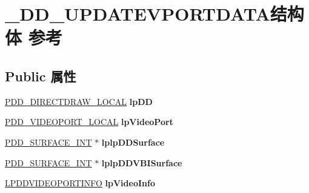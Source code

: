 \hypertarget{struct___d_d___u_p_d_a_t_e_v_p_o_r_t_d_a_t_a}{}\section{\+\_\+\+D\+D\+\_\+\+U\+P\+D\+A\+T\+E\+V\+P\+O\+R\+T\+D\+A\+T\+A结构体 参考}
\label{struct___d_d___u_p_d_a_t_e_v_p_o_r_t_d_a_t_a}
\subsection*{Public 属性}
\begin{DoxyCompactItemize}
\item 
\mbox{\label{struct___d_d___u_p_d_a_t_e_v_p_o_r_t_d_a_t_a_a70d8028db3624d856e4e37f30e7ee751}} 
\hyperlink{struct___d_d___d_i_r_e_c_t_d_r_a_w___l_o_c_a_l}{P\+D\+D\+\_\+\+D\+I\+R\+E\+C\+T\+D\+R\+A\+W\+\_\+\+L\+O\+C\+AL} {\bfseries lp\+DD}
\item 
\mbox{\label{struct___d_d___u_p_d_a_t_e_v_p_o_r_t_d_a_t_a_a5c44fc695c92c7760c0650cc8853be74}} 
\hyperlink{struct___d_d___v_i_d_e_o_p_o_r_t___l_o_c_a_l}{P\+D\+D\+\_\+\+V\+I\+D\+E\+O\+P\+O\+R\+T\+\_\+\+L\+O\+C\+AL} {\bfseries lp\+Video\+Port}
\item 
\mbox{\label{struct___d_d___u_p_d_a_t_e_v_p_o_r_t_d_a_t_a_aeba674db86683d3fecd6c22bcec8d168}} 
\hyperlink{struct___d_d___s_u_r_f_a_c_e___i_n_t}{P\+D\+D\+\_\+\+S\+U\+R\+F\+A\+C\+E\+\_\+\+I\+NT} $\ast$ {\bfseries lplp\+D\+D\+Surface}
\item 
\mbox{\label{struct___d_d___u_p_d_a_t_e_v_p_o_r_t_d_a_t_a_af66ae5c7bb9a3d3ed9ac8bf699874dc3}} 
\hyperlink{struct___d_d___s_u_r_f_a_c_e___i_n_t}{P\+D\+D\+\_\+\+S\+U\+R\+F\+A\+C\+E\+\_\+\+I\+NT} $\ast$ {\bfseries lplp\+D\+D\+V\+B\+I\+Surface}
\item 
\mbox{\label{struct___d_d___u_p_d_a_t_e_v_p_o_r_t_d_a_t_a_af427beb8c516ecbe7497f3f23eae414a}} 
\hyperlink{struct___d_d_v_i_d_e_o_p_o_r_t_i_n_f_o}{L\+P\+D\+D\+V\+I\+D\+E\+O\+P\+O\+R\+T\+I\+N\+FO} {\bfseries lp\+Video\+Info}

\end{DoxyCompactItemize}
